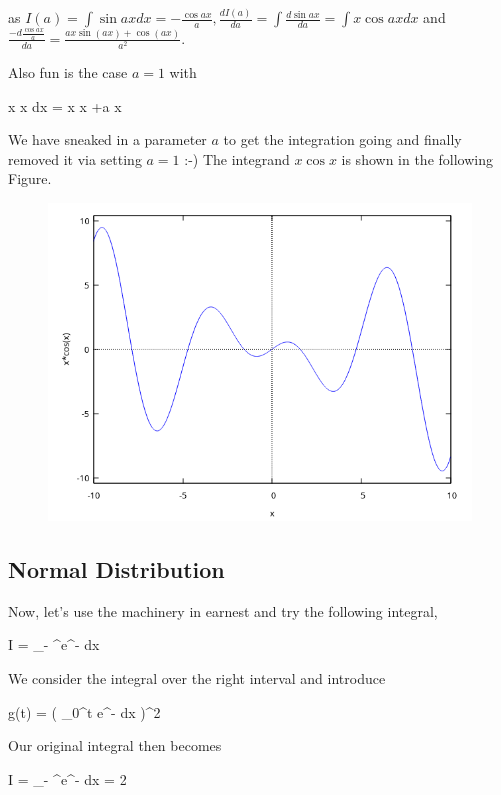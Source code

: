 as $I(a) = \int \sin ax dx = - \frac{\cos ax}{a}, \frac{dI(a)}{da} = \int \frac{d \sin ax}{da} = \int x \cos ax dx$ and \\ $\frac{- d \frac{\cos ax}{a}}{da} = \frac{a x \sin{\left( a x\right) }+\cos{\left( a x\right) }}{{{a}^{2}}}$.

Also fun is the case $a=1$ with

\bee
\int x \cos x dx = x \sin x +\cos a x
\eee

We have sneaked in a parameter $a$ to get the integration going and finally removed it via setting $a=1$ :-) The integrand $x \cos x$ is shown in the following Figure.

\begin{figure}[H]
\includegraphics[scale=0.7]{images/2022-03-21_plot_1.png}
\end{figure}
    

\subsection{Normal Distribution}

Now, let's use the machinery in earnest and try the following integral,

\bee
I = \int_{- \infty}^\infty e^{-} dx
\eee

We consider the integral over the right interval and introduce

\bee
g(t) = \left( \int_{0}^t e^{-} dx \right)^2
\eee

Our original integral then becomes

\bee
I = \int_{- \infty}^\infty e^{-} dx = 2 
\eee

